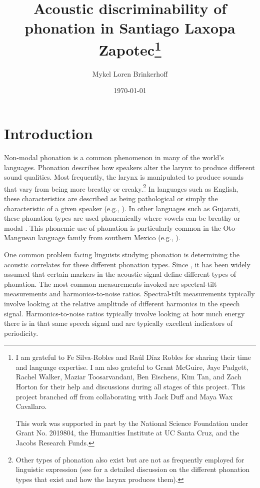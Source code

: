 \documentclass[12pt, letterpaper]{article}
\title{Acoustic discriminability of phonation in Santiago Laxopa Zapotec\thanks{I am grateful to Fe Silva-Robles and  Raúl Díaz Robles for sharing their time and language expertise. I am also grateful to Grant McGuire, Jaye Padgett, Rachel Walker, Maziar Toosarvandani, Ben Eischens, Kim Tan, and Zach Horton for their help and discussions during all stages of this project. This project branched off from collaborating with Jack Duff and Maya Wax Cavallaro.

This work was supported in part by the National Science Foundation under Grant No. 2019804, the Humanities Institute at UC Santa Cruz, and the Jacobs Research Funds.}}
\author{Mykel Loren Brinkerhoff}
\date{\today}
\begin{document}
	

    \onehalfspacing

\maketitle

\tableofcontents

\section{Introduction} \label{sec:Introduction}
Non-modal phonation is a common phenomenon in many of the world's languages. Phonation describes how speakers alter the larynx to produce different sound qualities. Most frequently, the larynx is manipulated to produce sounds that vary from being more breathy or creaky.\footnote{Other types of phonation also exist but are not as frequently employed for linguistic expression (see \cite{eslingVoiceQualityLaryngeal2019} for a detailed discussion on the different phonation types that exist and how the larynx produces them).} In languages such as English, these characteristics are described as being pathological or simply the characteristic of a given speaker (e.g., \cite{klattAnalysisSynthesisPerception1990}). In other languages such as Gujarati, these phonation types are used phonemically where vowels can be breathy or modal \citep{fischer-jorgensenPhoneticAnalysisBreathy1968}. This phonemic use of phonation is particularly common in the Oto-Manguean language family from southern Mexico (e.g., \cite{suarezMesoamericanIndianLanguages1983,campbellMesoAmericaLinguisticArea1986,silvermanLaryngealComplexityOtomanguean1997,campbellOtomangueanHistoricalLinguistics2017a,campbellOtomangueanHistoricalLinguistics2017}).

One common problem facing linguists studying phonation is determining the acoustic correlates for these different phonation types. Since \citet{fischer-jorgensenPhoneticAnalysisBreathy1968}, it has been widely assumed that certain markers in the acoustic signal define different types of phonation. The most common measurements invoked are spectral-tilt measurements and harmonics-to-noise ratios. Spectral-tilt measurements typically involve looking at the relative amplitude of different harmonics in the speech signal. Harmonics-to-noise ratios typically involve looking at how much energy there is in that same speech signal and are typically excellent indicators of periodicity. 
\end{document}
